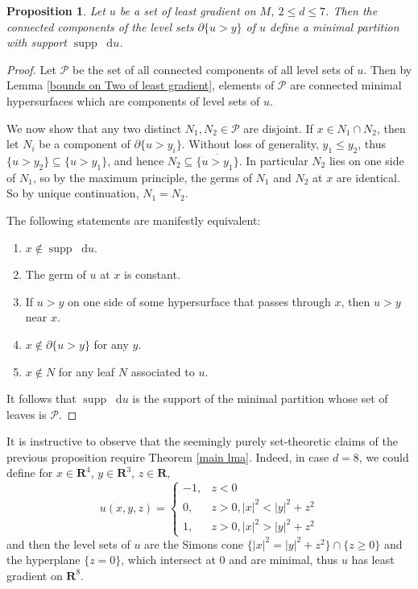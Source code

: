 \documentclass[reqno,10pt]{amsart}
\newcommand{\RR}{\mathbf{R}}
\DeclareMathOperator{\supp}{supp}
\newcommand*\dif{\mathop{}\!\mathrm{d}}
\newtheorem{proposition}[theorem]{Proposition}
\theoremstyle{definition}
\numberwithin{equation}{section}
\begin{document}
\begin{proposition}\label{construction of minimal partitions}
Let $u$ be a set of least gradient on $M$, $2 \leq d \leq 7$.
Then the connected components of the level sets $\partial \{u > y\}$ of $u$ define a minimal partition with support $\supp \dif u$.
\end{proposition}
\begin{proof}
Let $\mathscr P$ be the set of all connected components of all level sets of $u$.
Then by Lemma \ref{bounds on Two of least gradient}, elements of $\mathscr P$ are connected minimal hypersurfaces which are components of level sets of $u$.

We now show that any two distinct $N_1, N_2 \in \mathscr P$ are disjoint.
If $x \in N_1 \cap N_2$, then let $N_i$ be a component of $\partial \{u > y_i\}$.
Without loss of generality, $y_1 \leq y_2$, thus $\{u > y_2\} \subseteq \{u > y_1\}$, and hence $N_2 \subseteq \overline{\{u > y_1\}}$.
In particular $N_2$ lies on one side of $N_1$, so by the maximum principle, the germs of $N_1$ and $N_2$ at $x$ are identical.
So by unique continuation, $N_1 = N_2$.

The following statements are manifestly equivalent:
\begin{enumerate}
\item $x \notin \supp \dif u$.
\item The germ of $u$ at $x$ is constant.
\item If $u > y$ on one side of some hypersurface that passes through $x$, then $u > y$ near $x$.
\item $x \notin \partial \{u > y\}$ for any $y$.
\item $x \notin N$ for any leaf $N$ associated to $u$.
\end{enumerate}
It follows that $\supp \dif u$ is the support of the minimal partition whose set of leaves is $\mathscr P$.
\end{proof}

It is instructive to observe that the seemingly purely set-theoretic claims of the previous proposition require Theorem \ref{main lma}.
Indeed, in case $d = 8$, we could define for $x \in \RR^4$, $y \in \RR^3$, $z \in \RR$,
$$u(x, y, z) = \begin{cases}
-1, & z < 0 \\
0, & z > 0, |x|^2 < |y|^2 + z^2 \\
1, & z > 0, |x|^2 > |y|^2 + z^2
\end{cases}$$
and then the level sets of $u$ are the Simons cone $\{|x|^2 = |y|^2 + z^2\} \cap \{z \geq 0\}$ and the hyperplane $\{z = 0\}$, which intersect at $0$ and are minimal, thus $u$ has least gradient on $\RR^8$.
\end{document}
